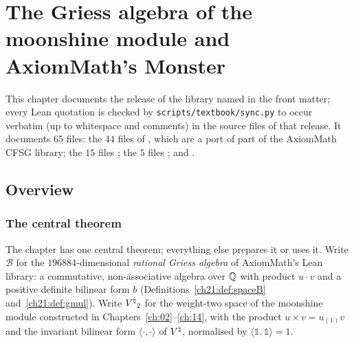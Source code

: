 \chapter{The Griess algebra of the moonshine module and AxiomMath's Monster}\label{ch:21}

\providecommand{\chXXIB}{\mathcal{B}}
\providecommand{\chXXIC}{\mathcal{C}}
\providecommand{\chXXIS}{\mathcal{S}}
\providecommand{\chXXIL}{\bar{\Lambda}}
\providecommand{\chXXIF}{\mathbb{F}_2}
\providecommand{\chXXISym}{\mathrm{Sym}}
\providecommand{\chXXIT}{\mathcal{T}}

This chapter documents the release of the library named in the front matter; every Lean quotation is checked by
\texttt{scripts/textbook/sync.py} to occur verbatim (up to whitespace and comments) in the source files
of that release.  It documents $65$ files:
the $44$ files of , which are a port of
part of the AxiomMath CFSG library; the $15$ files
; the $5$ files
; and
.

\section{Overview}\label{ch21:sec:intro}

\subsection{The central theorem}

The chapter has one central theorem; everything else prepares it or uses it.  Write $\chXXIB$ for the
$196884$-dimensional \emph{rational Griess algebra} of AxiomMath's Lean library: a commutative,
non-associative algebra over ${\mathbb{Q}}$ with product $u\cdot v$ and a positive definite bilinear form $b$
(Definitions~\ref{ch21:def:spaceB} and~\ref{ch21:def:gmul}).  Write ${V^{\natural}}_2$ for the weight-two space of
the moonshine module constructed in Chapters~\ref{ch:02}--\ref{ch:14}, with the product
$u\times v=u_{(1)}v$ and the invariant bilinear form $\langle\cdot,\cdot\rangle$ of ${V^{\natural}}$, normalised by
$\langle\mathbb1,\mathbb1\rangle=1$.

